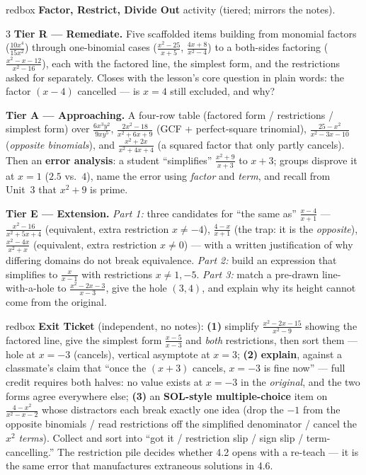 \documentclass[10pt]{article}
\begin{document}
\begin{skillbox}{redbox}
\textbf{Factor, Restrict, Divide Out} activity (tiered; mirrors the notes).
\begin{multicols}{3}
\textbf{Tier R --- Remediate.} Five scaffolded items building from monomial factors ($\frac{10x^4}{15x^2}$)
through one-binomial cases ($\frac{x^2-25}{x+5}$, $\frac{4x+8}{x^2-4}$) to a both-sides factoring
($\frac{x^2-x-12}{x^2-16}$), each with the factored line, the simplest form, and the restrictions asked
for separately. Closes with the lesson's core question in plain words: the factor $(x-4)$ cancelled ---
is $x=4$ still excluded, and why?

\columnbreak
\textbf{Tier A --- Approaching.} A four-row table (factored form / restrictions / simplest form) over
$\frac{6x^3y^2}{9xy^5}$, $\frac{2x^2-18}{x^2+6x+9}$ (GCF + perfect-square trinomial),
$\frac{25-x^2}{x^2-3x-10}$ (\emph{opposite binomials}), and $\frac{x^2+2x}{x^2+4x+4}$ (a squared factor
that only partly cancels). Then an \textbf{error analysis}: a student ``simplifies''
$\frac{x^2+9}{x+3}$ to $x+3$; groups disprove it at $x=1$ ($2.5$ vs.\ $4$), name the error using
\emph{factor} and \emph{term}, and recall from Unit~3 that $x^2+9$ is prime.

\columnbreak
\textbf{Tier E --- Extension.} \emph{Part 1:} three candidates for ``the same as'' $\frac{x-4}{x+1}$ ---
$\frac{x^2-16}{x^2+5x+4}$ (equivalent, extra restriction $x\neq-4$), $\frac{4-x}{x+1}$ (the trap: it is
the \emph{opposite}), $\frac{x^2-4x}{x^2+x}$ (equivalent, extra restriction $x\neq0$) --- with a written
justification of why differing domains do not break equivalence. \emph{Part 2:} build an expression
that simplifies to $\frac{x}{x-1}$ with restrictions $x\neq1,-5$. \emph{Part 3:} match a pre-drawn
line-with-a-hole to $\frac{x^2-2x-3}{x-3}$, give the hole $(3,4)$, and explain why its height cannot
come from the original.
\end{multicols}
\end{skillbox}

\begin{skillbox}{redbox}
\textbf{Exit Ticket} (independent, no notes): \textbf{(1)} simplify $\frac{x^2-2x-15}{x^2-9}$ showing
the factored line, give the simplest form $\frac{x-5}{x-3}$ and \emph{both} restrictions, then sort
them --- hole at $x=-3$ (cancels), vertical asymptote at $x=3$; \textbf{(2)} \textbf{explain}, against a
classmate's claim that ``once the $(x+3)$ cancels, $x=-3$ is fine now'' --- full credit requires both
halves: no value exists at $x=-3$ in the \emph{original}, and the two forms agree everywhere else;
\textbf{(3)} an \textbf{SOL-style multiple-choice} item on $\frac{4-x^2}{x^2-x-2}$ whose distractors
each break exactly one idea (drop the $-1$ from the opposite binomials / read restrictions off the
simplified denominator / cancel the $x^2$ \emph{terms}). Collect and sort into ``got it / restriction
slip / sign slip / term-cancelling.'' The restriction pile decides whether 4.2 opens with a re-teach ---
it is the same error that manufactures extraneous solutions in 4.6.
\end{skillbox}
\end{document}
